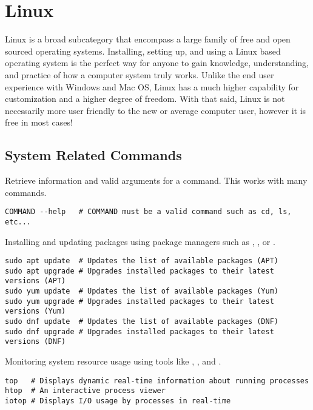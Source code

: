 \chapter{Linux}
\thispagestyle{fancy}
\lstset{language=Bash, style=terminalstyle}

Linux is a broad subcategory that encompass a large family of free and open sourced operating systems. Installing, setting up, and using a Linux based operating system is the perfect way for anyone to gain knowledge, understanding, and practice of how a computer system truly works. Unlike the end user experience with Windows and Mac OS, Linux has a much higher capability for customization and a higher degree of freedom. With that said, Linux is not necessarily more user friendly to the new or average computer user, however it is free in most cases!








\section{System Related Commands}

Retrieve information and valid arguments for a command. This works with many commands.
\begin{lstlisting}
COMMAND --help   # COMMAND must be a valid command such as cd, ls, etc...
\end{lstlisting}

Installing and updating packages using package managers such as , , or .
\begin{lstlisting}
sudo apt update  # Updates the list of available packages (APT)
sudo apt upgrade # Upgrades installed packages to their latest versions (APT)
sudo yum update  # Updates the list of available packages (Yum)
sudo yum upgrade # Upgrades installed packages to their latest versions (Yum)
sudo dnf update  # Updates the list of available packages (DNF)
sudo dnf upgrade # Upgrades installed packages to their latest versions (DNF)
\end{lstlisting}

Monitoring system resource usage using tools like , , and .
\begin{lstlisting}
top   # Displays dynamic real-time information about running processes
htop  # An interactive process viewer
iotop # Displays I/O usage by processes in real-time
\end{lstlisting}

